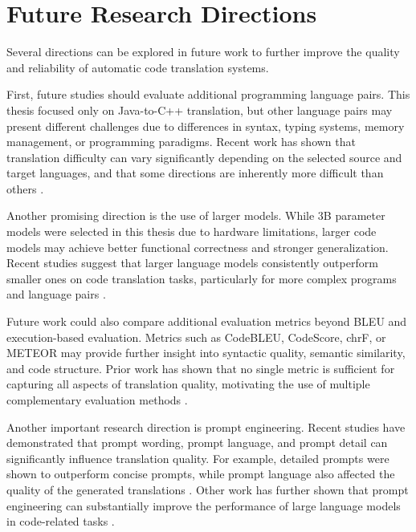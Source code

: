 \section{Future Research Directions}


Several directions can be explored in future work to further improve the quality
and reliability of automatic code translation systems.

First, future studies should evaluate additional programming language pairs.
This thesis focused only on Java-to-C++ translation, but other language pairs
may present different challenges due to differences in syntax, typing systems,
memory management, or programming paradigms. Recent work has shown that
translation difficulty can vary significantly depending on the selected source
and target languages, and that some directions are inherently more difficult
than others \cite{aljagthami2025prompt}.

Another promising direction is the use of larger models. While 3B parameter
models were selected in this thesis due to hardware limitations, larger code
models may achieve better functional correctness and stronger generalization.
Recent studies suggest that larger language models consistently outperform
smaller ones on code translation tasks, particularly for more complex programs
and language pairs \cite{yang2024llm, aljagthami2025prompt}.

Future work could also compare additional evaluation metrics beyond BLEU and
execution-based evaluation. Metrics such as CodeBLEU, CodeScore, chrF, or
METEOR may provide further insight into syntactic quality, semantic similarity,
and code structure. Prior work has shown that no single metric is sufficient
for capturing all aspects of translation quality, motivating the use of
multiple complementary evaluation methods \cite{evtikhiev2022bleu,
codescore2023}.

Another important research direction is prompt engineering. Recent studies have
demonstrated that prompt wording, prompt language, and prompt detail can
significantly influence translation quality. For example, detailed prompts were
shown to outperform concise prompts, while prompt language also affected the
quality of the generated translations \cite{aljagthami2025prompt}. Other work
has further shown that prompt engineering can substantially improve the
performance of large language models in code-related tasks \cite{chen2025prompt}.

